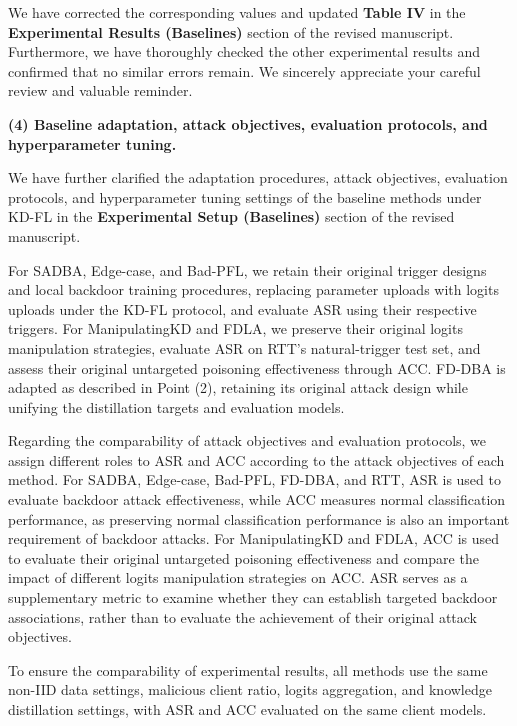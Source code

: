 \documentclass[11pt,a4paper]{article}
\newcommand{\manualindent}{\par\noindent\hspace*{1.5em}\ignorespaces}
\begin{document}
{\manualindent We have corrected the corresponding values and updated \textbf{Table IV} in the \textbf{Experimental Results (Baselines)} section of the revised manuscript. 
Furthermore, we have thoroughly checked the other experimental results and confirmed that no similar errors remain. 
We sincerely appreciate your careful review and valuable reminder.

\textbf{(4) Baseline adaptation, attack objectives, evaluation protocols, and hyperparameter tuning.}

\manualindent We have further clarified the adaptation procedures, attack objectives, evaluation protocols, and hyperparameter tuning settings of the baseline methods under KD-FL in the \textbf{Experimental Setup (Baselines)} section of the revised manuscript.

\manualindent For SADBA, Edge-case, and Bad-PFL, we retain their original trigger designs and local backdoor training procedures, replacing parameter uploads with logits uploads under the KD-FL protocol, and evaluate ASR using their respective triggers. 
For ManipulatingKD and FDLA, we preserve their original logits manipulation strategies, evaluate ASR on RTT's natural-trigger test set, and assess their original untargeted poisoning effectiveness through ACC. 
FD-DBA is adapted as described in Point (2), retaining its original attack design while unifying the distillation targets and evaluation models.

\manualindent Regarding the comparability of attack objectives and evaluation protocols, we assign different roles to ASR and ACC according to the attack objectives of each method.
For SADBA, Edge-case, Bad-PFL, FD-DBA, and RTT, ASR is used to evaluate backdoor attack effectiveness, while ACC measures normal classification performance, as preserving normal classification performance is also an important requirement of backdoor attacks.
For ManipulatingKD and FDLA, ACC is used to evaluate their original untargeted poisoning effectiveness and compare the impact of different logits manipulation strategies on ACC.
ASR serves as a supplementary metric to examine whether they can establish targeted backdoor associations, rather than to evaluate the achievement of their original attack objectives.

\manualindent To ensure the comparability of experimental results, all methods use the same non-IID data settings, malicious client ratio, logits aggregation, and knowledge distillation settings, with ASR and ACC evaluated on the same client models.

}
\end{document}
